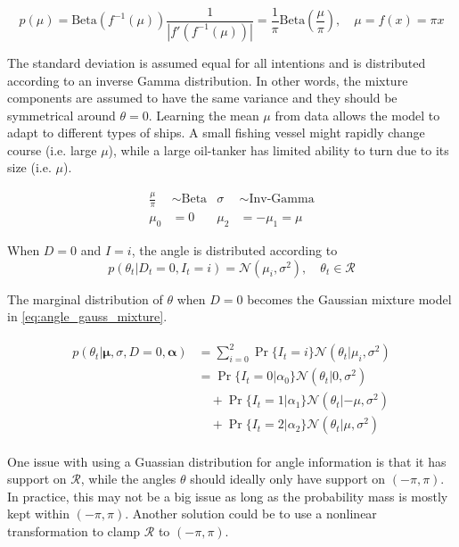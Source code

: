 \begin{equation}\label{eq:prior_mu}
    p(\mu) = \text{Beta}(f^{-1}(\mu)) \frac{1}{|f'(f^{-1}(\mu))|}  = \frac{1}{\pi} \text{Beta}(\frac{\mu}{\pi}), \quad \mu = f(x) = \pi x
\end{equation}

The standard deviation is assumed equal for all intentions and is distributed according to an inverse Gamma distribution. In other words, the mixture components are assumed to have the same variance and they should be symmetrical around $\theta=0$.
Learning the mean $\mu$ from data allows the model to adapt to different types of ships. A small fishing vessel might rapidly change course (i.e. large $\mu$), while a large oil-tanker has limited ability to turn due to its size (i.e. $\mu$). 

\begin{align}
     \frac{\mu}{\pi} &\sim \text{Beta} & \sigma &\sim \text{Inv-Gamma} \\
     \mu_0 &= 0 & \mu_{2} &= -\mu_{1} = \mu
\end{align}

When $D=0$ and $I=i$, the angle is distributed according to
\begin{equation}\label{eq:theta_intention_mixture}
    p(\theta_t | D_t=0, I_t=i) = \mathcal{N}(\mu_i, \sigma^2), \quad \theta_t \in \mathcal{R}
\end{equation}

The marginal distribution of $\theta$ when $D=0$ becomes the Gaussian mixture model in \cref{eq:angle_gauss_mixture}.

\begin{align}\label{eq:angle_gauss_mixture}
\begin{split}
    p(\theta_t | \boldsymbol{\mu}, \sigma, D=0, \boldsymbol{\alpha}) &= \sum_{i=0}^2 \Pr\{I_t=i\}\mathcal{N}(\theta_t | \mu_i, \sigma^2) \\
    &=\Pr\{I_t=0 | \alpha_0\}\mathcal{N}(\theta_t | 0, \sigma^2)\\
    &\quad+\Pr\{I_t=1 | \alpha_1\}\mathcal{N}(\theta_t | -\mu, \sigma^2)\\
    &\quad+\Pr\{I_t=2 | \alpha_2\}\mathcal{N}(\theta_t | \mu, \sigma^2)
\end{split}
\end{align}

One issue with using a Guassian distribution for angle information is that it has support on $\mathcal{R}$, while the angles $\theta$ should ideally only have support on $(-\pi, \pi)$. In practice, this may not be a big issue as long as the probability mass is mostly kept within $(-\pi, \pi)$. Another solution could be to use a nonlinear transformation to clamp $\mathcal{R}$ to $(-\pi, \pi)$.

